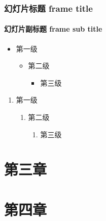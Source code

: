 \documentclass[12pt]{beamer}
\begin{document}
\begin{frame}[t]
    \frametitle{幻灯片标题 frame title}
    \framesubtitle{幻灯片副标题 frame sub title}

    \begin{itemize}
        \item 第一级
        \begin{itemize}
            \item 第二级
            \begin{itemize}
                \item 第三级
            \end{itemize}
        \end{itemize}
    \end{itemize}

    \begin{enumerate}
        \item 第一级
        \begin{enumerate}
            \item 第二级
            \begin{enumerate}
                \item 第三级
            \end{enumerate}
        \end{enumerate}
    \end{enumerate}

\end{frame}

\section{第三章}

\section{第四章}


\makebottom
\end{document}
